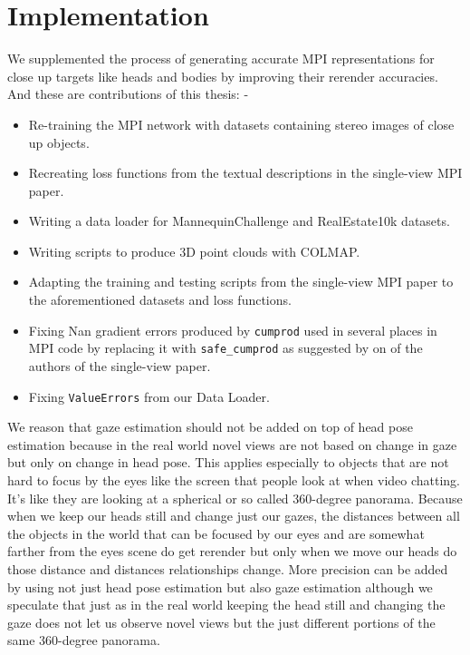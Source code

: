 \section{Implementation}\label{sec:implementation} 


We supplemented the process of generating accurate MPI representations for close up targets like heads and bodies by improving their rerender accuracies. And these are contributions of this thesis: -
\begin{itemize}
    \item Re-training the MPI network with datasets containing stereo images of close up objects.  
    \item Recreating loss functions from the textual descriptions in the single-view MPI paper.
    \item Writing a data loader for MannequinChallenge and RealEstate10k datasets.
    \item Writing scripts to produce 3D point clouds with COLMAP.
    \item Adapting the training and testing scripts from the single-view MPI paper to the aforementioned datasets and loss functions.
    \item Fixing Nan gradient errors produced by \texttt{cumprod} used in several places in MPI code by replacing it with \texttt{safe\_cumprod} as suggested by on of the authors of the single-view paper.
    \item Fixing \texttt{ValueErrors} from our Data Loader.
\end{itemize}

We reason that gaze estimation should not be added on top of head pose estimation because in the real world novel views are not based on change in gaze but only on change in head pose. This applies especially to objects that are not hard to focus by the eyes like the screen that people look at when video chatting. It's like they are looking at a spherical or so called 360-degree panorama. Because when we keep our heads still and change just our gazes, the distances between all the objects in the world that can be focused by our eyes and are somewhat farther from the eyes scene do get rerender but only when we move our heads do those distance and distances relationships change. More precision can be added by using not just head pose estimation but also gaze estimation although we speculate that just as in the real world keeping the head still and changing the gaze does not let us observe novel views but the just different portions of the same 360-degree panorama.

